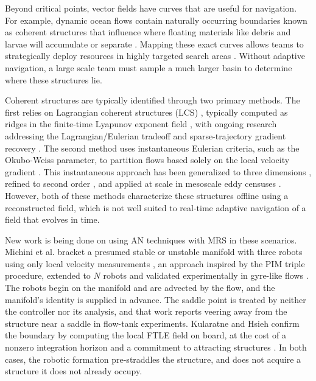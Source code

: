 \documentclass[lettersize,journal]{IEEEtran}
\begin{document}
Beyond critical points, vector fields have curves that are useful for navigation. For example, dynamic ocean flows contain naturally occurring boundaries known as coherent structures that influence where floating materials like debris and larvae will accumulate or separate \cite{11,12}. Mapping these exact curves allows teams to strategically deploy resources in highly targeted search areas \cite{12,13,14,15}. Without adaptive navigation, a large scale team must sample a much larger basin to determine where these structures lie.

Coherent structures are typically identified through two primary methods. The first relies on Lagrangian coherent structures (LCS) \cite{16}, typically computed as ridges in the finite-time Lyapunov exponent field \cite{17}, with ongoing research addressing the Lagrangian/Eulerian tradeoff and sparse-trajectory gradient recovery \cite{18,19,20,21}. The second method uses instantaneous Eulerian criteria, such as the Okubo-Weiss parameter, to partition flows based solely on the local velocity gradient \cite{8,22}. This instantaneous approach has been generalized to three dimensions \cite{23}, refined to second order \cite{24}, and applied at scale in mesoscale eddy censuses \cite{25}. However, both of these methods characterize these structures offline using a reconstructed field, which is not well suited to real-time adaptive navigation of a field that evolves in time.  

New work is being done on using AN techniques with MRS in these scenarios. Michini et al. bracket a presumed stable or
unstable manifold with three robots using only local velocity
measurements \cite{26}, an approach inspired by the PIM triple
procedure, extended to $N$ robots \cite{27} and validated
experimentally in gyre-like flows \cite{28}. The robots begin on the
manifold and are advected by the flow, and the manifold's identity is
supplied in advance. The saddle point is treated by neither the
controller nor its analysis, and that work reports veering away from
the structure near a saddle in flow-tank experiments. Kularatne and Hsieh confirm the boundary by computing the local FTLE field on board, at the cost of a nonzero integration horizon and a commitment to attracting structures \cite{29}. In both cases, the robotic formation pre-straddles the structure, and does not acquire a structure it does not already occupy.
\end{document}
